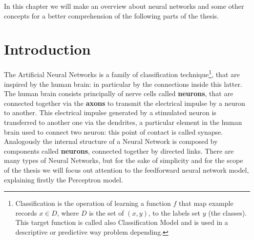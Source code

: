 \label{chap:ann}
In this chapter we will make an overview about neural networks and some other concepts for a better comprehension of the following parts of the thesis.

\section{Introduction}
The Artificial Neural Networks is a family of classification technique\footnote{Classification is the operation of learning a function \textbf{$f$} that map example records \textbf{$x \in D$}, where $D$ is the set of \textbf{$(x, y)$}, to the labels set \textbf{$y$} (the classes). This target function is called also Classification Model and is used in a descriptive or predictive way problem depending.}, that are inspired by the human brain: in particular by the connections inside this latter. The human brain consists principally of nerve cells called \textbf{neurons}, that are connected together via the \textbf{axons} to transmit the electrical impulse by a neuron to another. This electrical impulse generated by a stimulated neuron is transferred to another one via the dendrites, a particular element in the human brain used to connect two neuron: this point of contact is called synapse. \newline\newline
Analogously the internal structure of a Neural Network is composed by components called \textbf{neurons}, connected together by directed links. There are many types of Neural Networks, but for the sake of simplicity and  for the scope of the thesis we will focus out attention to the feedforward neural network model, explaining firstly the Perceptron model.

